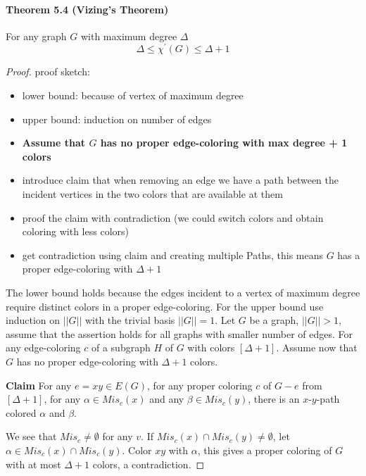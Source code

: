 \paragraph{Theorem 5.4 (Vizing's Theorem)}
For any graph $ G $ with maximum degree $\Delta$
$$ \Delta \leq \chi^\prime(G) \leq \Delta + 1 $$
\begin{proof}
    proof sketch: 
    \begin{itemize}
        \item lower bound: because of vertex of maximum degree

        \item upper bound: induction on number of edges

        \item \textbf{Assume that $G$ has no proper edge-coloring with 
        max degree + 1 colors}

        \item introduce claim that when removing an edge we have 
        a path between the incident vertices in the two colors that are
        available at them 

        \item proof the claim with contradiction (we could switch colors and 
        obtain coloring with less colors)

        \item get contradiction using claim and creating multiple Paths, this
        means $G$ has a proper edge-coloring with $\Delta +1$
    \end{itemize}


    \bigskip
    The lower bound holds because the edges incident to a vertex of maximum
    degree require distinct colors in a proper edge-coloring. For the upper 
    bound use induction on $||G||$ with the trivial basis $||G|| = 1$. Let 
    $G$ be a graph, $||G|| > 1$, assume that the assertion holds for all 
    graphs with smaller number of edges. For any edge-coloring $c$ of a 
    subgraph $H$ of $G$ with colors $[\Delta+1]$.
    Assume now that $G$ has no proper edge-coloring with $\Delta+1$ colors.

    \smallskip
    \textbf{Claim} For any $e = xy \in E(G)$, for any proper coloring $c$ of 
    $G-e$ from $[\Delta +1]$, for any $\alpha \in Mis_c(x)$ and any 
    $\beta \in Mis_c(y)$, there is an $x$-$y$-path colored $\alpha$ and $\beta$.

    \smallskip
    We see that $Mis_c \neq \emptyset$ for any $v$. If $Mis_c(x) \cap Mis_c(y)
    \neq \emptyset$, let $\alpha \in Mis_c(x) \cap Mis_c(y)$. Color $xy$ with
    $\alpha$, this gives a proper coloring of $G$ with at most $\Delta +1$ 
    colors, a contradiction. 


\end{proof}
